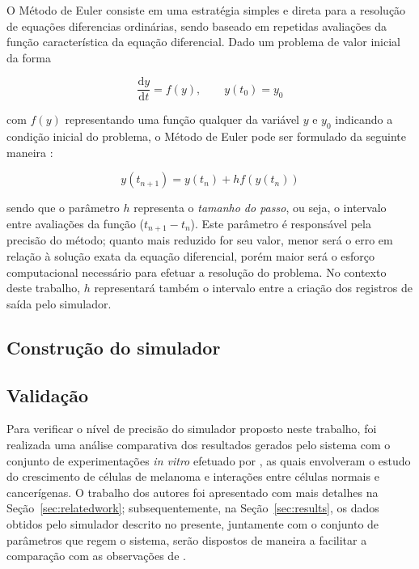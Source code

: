 \documentclass[12pt]{article}
\begin{document}
O Método de Euler consiste em uma estratégia simples e direta para a resolução de equações diferencias ordinárias, sendo baseado em repetidas avaliações da função característica da equação diferencial. Dado um problema de valor inicial da forma

\begin{equation}
  \frac{\mathrm{d} y}{\mathrm{d} t} = f(y), \qquad y(t_{0}) = y_{0}
\end{equation}

\noindent com $f(y)$ representando uma função qualquer da variável $y$ e $y_{0}$ indicando a condição inicial do problema, o Método de Euler pode ser formulado da seguinte maneira \cite{Butcher2016}:

\begin{equation}
  y(t_{n+1}) = y(t_{n}) + h f(y(t_{n}))
\end{equation}

\noindent sendo que o parâmetro $h$ representa o \emph{tamanho do passo}, ou seja, o intervalo entre avaliações da função ($t_{n+1} - t_{n}$). Este parâmetro é responsável pela precisão do método; quanto mais reduzido for seu valor, menor será o erro em relação à solução exata da equação diferencial, porém maior será o esforço computacional necessário para efetuar a resolução do problema. No contexto deste trabalho, $h$ representará também o intervalo entre a criação dos registros de saída pelo simulador.

\subsection{Construção do simulador} \label{sec:simulator}


\subsection{Validação}

Para verificar o nível de precisão do simulador proposto neste trabalho, foi realizada uma análise comparativa dos resultados gerados pelo sistema com o conjunto de experimentações \textit{in vitro} efetuado por \cite{Cornil1991}, as quais envolveram o estudo do crescimento de células de melanoma e interações entre células normais e cancerígenas. O trabalho dos autores foi apresentado com mais detalhes na Seção~\ref{sec:relatedwork}; subsequentemente, na Seção~\ref{sec:results}, os dados obtidos pelo simulador descrito no presente, juntamente com o conjunto de parâmetros que regem o sistema, serão dispostos de maneira a facilitar a comparação com as observações de \cite{Cornil1991}.
\end{document}
